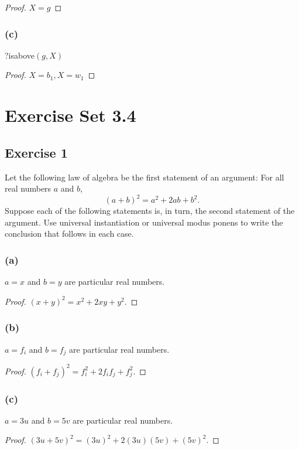 \documentclass[14pt]{extarticle}
\begin{document}
\begin{proof}
    $X = g$
\end{proof}

\subsubsection{(c)}
?isabove$(g, X)$

\begin{proof}
    $X = b_1, X = w_1$
\end{proof}

\section{Exercise Set 3.4}

\subsection{Exercise 1}
Let the following law of algebra be the first statement of an argument: For all real numbers $a$ and $b$,
$$
    (a + b)^2 = a^2 + 2ab + b^2.
$$
Suppose each of the following statements is, in turn, the second statement of the argument. Use universal instantiation or universal modus ponens to write the conclusion that follows in each case.

\subsubsection{(a)}
$a = x$ and $b = y$ are particular real numbers.

\begin{proof}
    $(x + y)^2 = x^2 + 2xy + y^2.$
\end{proof}

\subsubsection{(b)}
$a = f_i$ and $b = f_j$ are particular real numbers.

\begin{proof}
    $(f_i + f_j)^2 = f_i^2 + 2f_if_j + f_j^2. $
\end{proof}

\subsubsection{(c)}
$a = 3u$ and $b = 5v$ are particular real numbers.

\begin{proof}
    $(3u + 5v)^2 = (3u)^2 + 2(3u)(5v) + (5v)^2. $
\end{proof}
\end{document}

